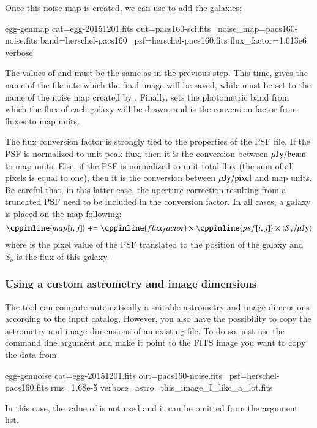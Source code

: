 Once this noise map is created, we can use  to add the galaxies:
\begin{bashcode}
egg-genmap cat=egg-20151201.fits out=pacs160-sci.fits \
    noise_map=pacs160-noise.fits band=herschel-pacs160 \
    psf=herschel-pacs160.fits flux_factor=1.613e6 verbose
\end{bashcode}
The values of \bashinline{cat} and \bashinline{psf} must be the same as in the previous step. This time,  gives the name of the file into which the final image will be saved, while  must be set to the name of the noise map created by . Finally,  sets the photometric band from which the flux of each galaxy will be drawn, and  is the conversion factor from fluxes to map units.

The flux conversion factor is strongly tied to the properties of the PSF file. If the PSF is normalized to unit peak flux, then it is the conversion between $\mu{\rm Jy}/{\rm beam}$ to map units. Else, if the PSF is normalized to unit total flux (the sum of all pixels is equal to one), then it is the conversion between $\mu{\rm Jy}/{\rm pixel}$ and map units. Be careful that, in this latter case, the aperture correction resulting from a truncated PSF need to be included in the conversion factor. In all cases, a galaxy is placed on the map following:
\begin{equation}
\cppinline{map[i,j]} \mathrel{+}= \cppinline{flux_factor} \times {} \times (S_{\nu}/\uJy) \nonumber
\end{equation}
where \cppinline{psf[i,j]} is the pixel value of the PSF translated to the position of the galaxy and $S_{\nu}$ is the flux of this galaxy.


\subsubsection{Using a custom astrometry and image dimensions}

The tool  can compute automatically a suitable astrometry and image dimensions according to the input catalog. However, you also have the possibility to copy the astrometry and image dimensions of an existing file. To do so, just use the  command line argument and make it point to the FITS image you want to copy the data from:
\begin{bashcode}
egg-gennoise cat=egg-20151201.fits out=pacs160-noise.fits \
    psf=herschel-pacs160.fits rms=1.68e-5 verbose \
    astro=this_image_I_like_a_lot.fits
\end{bashcode}
In this case, the value of \bashinline{aspix} is not used and it can be omitted from the argument list.


